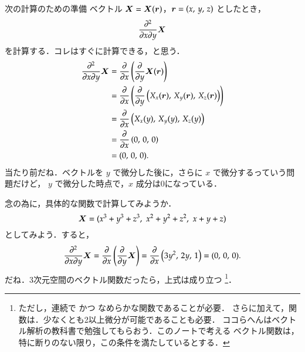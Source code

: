 %
%
            \begin{memo}{次の計算のための準備}
                ベクトル $\boldsymbol{X}=\boldsymbol{X}(\boldsymbol{r})$，$\boldsymbol{r}=(x,\,y,\,z)$ としたとき，
                    \begin{equation*}
                        \frac{{\partial}^{2}}{\partial x \partial y} \boldsymbol{X}
                    \end{equation*}
                を計算する．コレはすぐに計算できる，と思う．
                    \begin{align*}
                        \frac{{\partial}^{2}}{\partial x \partial y} \boldsymbol{X}
                         &= \frac{\partial}{\partial x} \left( \frac{\partial}{\partial y} \boldsymbol{X}(\boldsymbol{r}) \right) \\
                         &= \frac{\partial}{\partial x} \left( \frac{\partial}{\partial y} \left({X}_{x}(\boldsymbol{r}),\, {X}_{y}(\boldsymbol{r}),\, {X}_{z}(\boldsymbol{r})\right) \right) \\
                         &= \frac{\partial}{\partial x} \left( {X}_{x}(y) ,\, {X}_{y}(y),\, {X}_{z}(y) \right) \\
                         &= \frac{\partial}{\partial x} \left( 0,\,0,\,0 \right) \\
                         &= (0,\, 0,\, 0).
                    \end{align*}
                当たり前だね．ベクトルを $y$ で微分した後に，さらに $x$ で微分するっていう問題だけど，
                $y$ で微分した時点で，$x$ 成分は0になっている．

                念の為に，具体的な関数で計算してみようか．
                    \begin{equation*}
                        \boldsymbol{X}=({x}^{3}+{y}^{3}+{z}^{3},\,\,{x}^{2}+{y}^{2}+{z}^{2},\,\,x+y+z)
                    \end{equation*}
                としてみよう．すると，
                    \begin{equation*}
                        \frac{{\partial}^{2}}{\partial x \partial y} \boldsymbol{X}
                            = \frac{\partial}{\partial x} \left( \frac{\partial}{\partial y} \boldsymbol{X} \right)
                            = \frac{\partial}{\partial x} \left(3{y}^{2},\,2y,\,1\right)
                            = (0,\,0,\,0).
                    \end{equation*}
                だね．3次元空間のベクトル関数だったら，上式は成り立つ
                    \footnote{
                        ただし，連続で かつ なめらかな関数であることが必要．
                        さらに加えて，関数は．少なくとも2以上微分が可能であることも必要．
                        ココらへんはベクトル解析の教科書で勉強してもらおう．このノートで考える
                        ベクトル関数は，特に断りのない限り，この条件を満たしているとする．
                    }．
            \end{memo}

